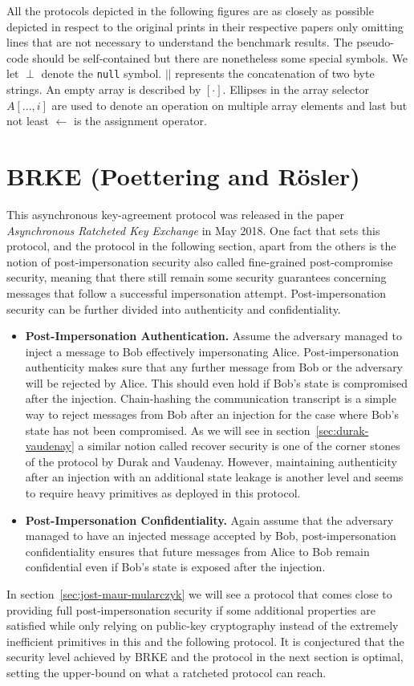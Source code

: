 \documentclass[11pt,a4paper,twoside,openright,bibliography=totoc]{scrbook}
\begin{document}
All the protocols depicted in the following figures are as closely
as possible depicted in respect to the original prints in their respective
papers only omitting lines that are not necessary
to understand the benchmark results. The pseudo-code should be self-contained
but there are nonetheless
some special symbols. We let $\perp$ denote the \texttt{null} symbol.
$||$ represents the concatenation of two byte strings. An empty
array is described by $[\cdot]$. Ellipses in the array selector
$A[...,i]$ are used to
denote an operation on multiple array elements and last but not least
$\leftarrow$ is the assignment operator.

\section[BARK (Poettering and Rösler)]
{BRKE (Poettering and Rösler)~\cite{poettering2018towards}}
\label{sec:poettering-roesler}

This asynchronous key-agreement protocol was released in the paper
\textit{Asynchronous Ratcheted Key Exchange} in May 2018.
One fact that sets this protocol, and the protocol in the following
section, apart from the others is the notion of post-impersonation security
also called fine-grained post-compromise security,
meaning that there still remain some security guarantees concerning
messages that follow a successful
impersonation attempt. Post-impersonation security can be further divided
into authenticity and confidentiality.
\begin{itemize}
\item \textbf{Post-Impersonation Authentication.} Assume the adversary
  managed to inject a message to Bob effectively impersonating Alice.
  Post-impersonation authenticity makes sure that any further message
  from Bob or the adversary will be rejected by Alice. This should even hold if
  Bob's state is compromised after the injection. Chain-hashing
  the communication transcript is a simple way to reject messages from
  Bob after an injection for the case where Bob's state has not
  been compromised. As we will see in section~\ref{sec:durak-vaudenay}
  a similar notion called recover security is one of the corner stones
  of the protocol by Durak and Vaudenay. However, maintaining authenticity
  after an injection with an additional state leakage is another level
  and seems to require heavy primitives as deployed in this protocol.
\item \textbf{Post-Impersonation Confidentiality.} Again assume
  that the adversary managed to have an injected message accepted by Bob,
  post-impersonation confidentiality ensures that future messages from
  Alice to Bob remain
  confidential even if Bob's state is exposed after the injection.
\end{itemize}
In section~\ref{sec:jost-maur-mularczyk} we will see a protocol
that comes close to providing full post-impersonation security
if some additional properties are satisfied while only relying on
public-key cryptography instead of the extremely inefficient
primitives in this and the following protocol. It is conjectured
that the security level achieved by BRKE and the protocol
in the next section is optimal, setting the upper-bound
on what a ratcheted protocol can reach.
\end{document}
